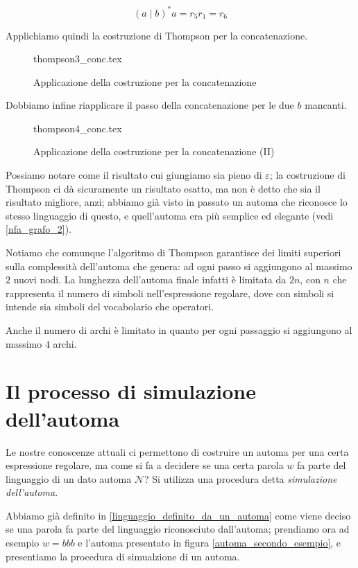 \documentclass[class=book, crop=false, oneside, 12pt]{standalone}
\begin{document}
\begin{equation}
    (a \mid b)^\ast a = r_5 r_1 = r_6
\end{equation}

\noindent Applichiamo quindi la costruzione di Thompson per la concatenazione.

\begin{figure}
    \centering
    {thompson3_conc.tex}
    \caption{Applicazione della costruzione per la concatenazione}
    \label{esempio_Thompson_3}
\end{figure}

\noindent Dobbiamo infine riapplicare il passo della concatenazione per le due \(b\) mancanti.

\begin{figure}
    \centering
    {thompson4_conc.tex}
    \caption{Applicazione della costruzione per la concatenazione (II)}
    \label{esempio_Thompson_4}
\end{figure}

Possiamo notare come il risultato cui giungiamo sia pieno di \(\varepsilon\); la costruzione di Thompson ci dà sicuramente un risultato esatto, ma non è detto che sia il risultato migliore, anzi; abbiamo già visto in passato un automa che riconosce lo stesso linguaggio di questo, e quell'automa era più semplice ed elegante (vedi \ref{nfa_grafo_2}).

Notiamo che comunque l’algoritmo di Thompson garantisce dei limiti superiori sulla complessità dell’automa che genera: ad ogni passo si aggiungono al massimo \(2\) nuovi nodi.
La lunghezza dell’automa finale infatti è limitata da \(2n\), con \(n\) che rappresenta il numero di simboli nell’espressione regolare, dove con simboli si intende sia simboli del vocabolario che operatori.

Anche il numero di archi è limitato in quanto per ogni passaggio si aggiungono al massimo \(4\) archi.

\section{Il processo di simulazione dell’automa}
Le nostre conoscenze attuali ci permettono di costruire un automa per una certa espressione regolare, ma come si fa a decidere se una certa parola \(w\) fa parte del linguaggio di un dato automa \(\mathcal{N}\)? Si utilizza una procedura detta \emph{simulazione dell’automa}.

Abbiamo già definito in \ref{linguaggio_definito_da_un_automa} come viene deciso se una parola fa parte del linguaggio riconosciuto dall’automa; prendiamo ora ad esempio \(w = bbb\) e l’automa presentato in figura \ref{automa_secondo_esempio}, e presentiamo la procedura di simualzione di un automa.
\end{document}
